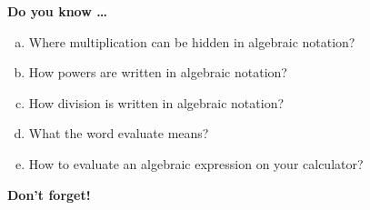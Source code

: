 

\bigskip

\noindent \textbf{Do you know \ldots}

\begin{enumerate} [(a)]
\item Where multiplication can be hidden in algebraic notation? \vfill
\item How powers are written in algebraic notation? \vfill
\item How division is written in algebraic notation? \vfill
\item What the word evaluate means? \vfill
\item How to evaluate an algebraic expression on your calculator? \vfill
\end{enumerate}

\noindent \textbf{Don't forget!}
\vfill \vfill \vfill





